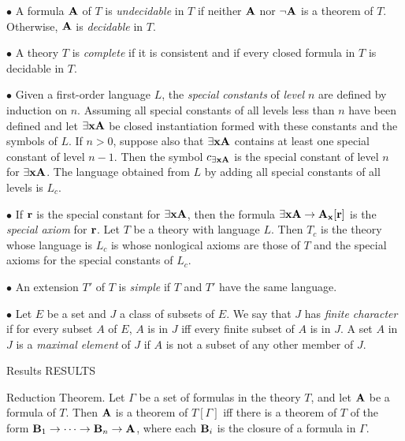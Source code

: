 \item{$\bullet$} A formula ${\bf A}$ of $T$ is {\it undecidable} in $T$ if neither ${\bf A}$
nor $\neg{\bf A}$ is a theorem of $T$. Otherwise, ${\bf A}$ is {\it decidable} in $T$.

\item{$\bullet$} A theory $T$ is {\it complete} if it is consistent and if every
closed formula in $T$ is decidable in $T$.

\item{$\bullet$} Given a first-order language $L$, the {\it special constants} of
{\it level $n$} are defined by induction on $n$. Assuming all special constants of
all levels less than $n$ have been defined and let $\exists{\bf x}{\bf A}$ be closed instantiation
formed with these constants and the symbols of $L$. If $n > 0$, suppose also that
$\exists{\bf x}{\bf A}$ contains at least one special constant of level $n-1$. Then the symbol
$c_{\exists{\bf x}{\bf A}}$ is the special constant of level $n$ for $\exists{\bf x}{\bf A}$. The language
obtained from $L$ by adding all special constants of all levels is $L_c$.

\item{$\bullet$} If ${\bf r}$ is the special constant for $\exists{\bf x}{\bf A}$, then the formula
$\exists{\bf x}{\bf A} \to {\bf A}_{\bf x}[{\bf r}]$ is the {\it special axiom} for ${\bf r}$. Let $T$ be a theory
with language $L$. Then $T_c$ is the theory whose language is $L_c$ is whose
nonlogical axioms are those of $T$ and the special axioms for the special constants
of $L_c$.

\item{$\bullet$} An extension $T'$ of $T$ is {\it simple} if $T$ and $T'$ have 
the same language.

\item{$\bullet$} Let $E$ be a set and $J$ a class of subsets of $E$. We say that $J$
has {\it finite character} if for every subset $A$ of $E$, $A$ is in $J$ iff every
finite subset of $A$ is in $J$. A set $A$ in $J$ is a {\it maximal element} of $J$
if $A$ is not a subset of any other member of $J$.

 {Results}
\beginsection RESULTS


\proclaim Reduction Theorem. Let $\Gamma$ be a set of formulas in the theory $T$, and
let ${\bf A}$ be a formula of $T$. Then ${\bf A}$ is a theorem of $T[\Gamma]$ iff there is a
theorem of $T$ of the form ${\bf B}_1 \to \cdots \to {\bf B}_n \to {\bf A}$, where each ${\bf B}_i$ is
the closure of a formula in $\Gamma$.

